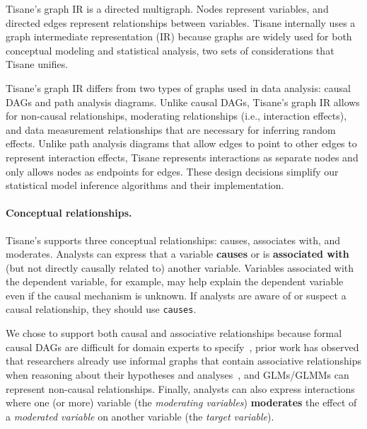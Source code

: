 Tisane's graph IR is a %
directed multigraph.
Nodes
represent variables, and directed edges represent relationships between
variables. Tisane internally uses a graph intermediate representation (IR) because graphs are widely
used for both conceptual modeling and statistical analysis, two sets of
considerations that Tisane unifies.

Tisane's graph IR differs from two types of graphs
used in data analysis: causal DAGs and path analysis diagrams. Unlike
causal DAGs, Tisane's graph IR allows for non-causal relationships, moderating relationships
(i.e., interaction effects), and data measurement relationships that
are necessary for inferring random effects. Unlike path analysis diagrams that
allow edges to point to other edges to represent
interaction effects,
Tisane represents interactions as separate nodes and only allows nodes as endpoints
for edges. These design decisions simplify our statistical model
inference algorithms and their implementation.


\paragraph{Conceptual relationships.}

Tisane's \SDSL supports three conceptual relationships: causes, associates with,
and moderates. Analysts can express that a variable \textbf{causes} or is
\textbf{associated with} (but not directly causally related to) another variable.
Variables associated with the dependent variable, for example, may help explain
the dependent variable even if the causal mechanism is unknown. If analysts are
aware of or suspect a causal relationship, they should use
\texttt{causes}.

We chose to support both causal and associative relationships because formal
causal DAGs are difficult for domain experts to
specify~\cite{suzuki2020causal,suzuki2018mechanisms,velentgas2013developing},
prior work has observed that researchers already use informal graphs that
contain associative relationships when reasoning about their hypotheses and
analyses~\cite{jun2021hypothesisFormalization}, and GLMs/GLMMs can represent
non-causal relationships. Finally, analysts can also express interactions where
one (or more) variable (the \textit{moderating variables}) \textbf{moderates}
the effect of a \textit{moderated variable} on another variable (the
\textit{target variable}).

